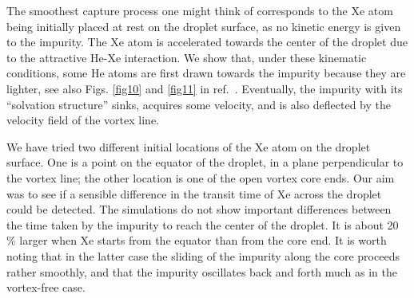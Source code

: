 

The smoothest capture process one might think of corresponds to  the Xe atom being initially placed at rest on the droplet surface, as no kinetic energy is 
given to the impurity. The Xe atom is accelerated  towards the center of the droplet due to the attractive He-Xe interaction. 
We show  that, under these kinematic conditions, some He atoms are first drawn towards the  impurity because they are lighter, see also Figs. \ref{fig10} and \ref{fig11} in ref.~\cite{ESI}. 
Eventually, the impurity with its ``solvation structure'' sinks, acquires some velocity, and is also deflected by the velocity field of the 
vortex line. 

 We have tried two different initial locations of the Xe atom on the droplet surface.  One is  a point on the equator of the droplet, in a plane perpendicular to the vortex line; 
 the other location is one of the open vortex core ends.  Our aim was to see if a sensible difference in the transit time of Xe across the droplet
could be detected.  The simulations do not show important differences between the time taken by the impurity to reach the center of the droplet. It is about 20 \% larger
when Xe starts from the equator than from the core end.\cite{ESI} It is worth noting that  in the latter case the sliding of the impurity along the core proceeds rather smoothly, and that the impurity
oscillates back and forth much as in the vortex-free case. 

